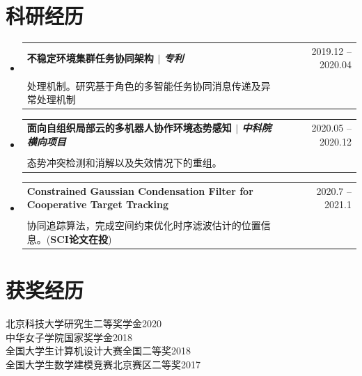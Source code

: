 \documentclass[a4paper,11pt]{ctexart}
\makeatletter
\newcommand{\CVItem}[1]{
	\item\small{
		{#1 \vspace{-2pt}}
	}
}
\newcommand{\CVSubheading}[4]{
	\vspace{-2pt}\item
	\begin{tabular*}{0.97\textwidth}[t]{l@{\extracolsep{\fill}}r}
		\textbf{#1} & #2 \\
		\small#3 & \small #4 \\
	\end{tabular*}\vspace{-7pt}
}
\newcommand{\CVSubHeadingListStart}{\begin{itemize}[leftmargin=0.5cm, label={}]}
\newcommand{\CVSubHeadingListEnd}{\end{itemize}}
\newcommand{\CVItemListStart}{\begin{itemize}}
\newcommand{\CVItemListEnd}{\end{itemize}\vspace{-5pt}}
\makeatother
\begin{document}
	\section{科研经历}
	\CVSubHeadingListStart
	\CVSubheading
	{不稳定环境集群任务协同架构 $|$ \emph{\small{专利}}}{2019.12 -- 2020.04}
	{\makecell[l]{\hspace{2em}构建基于角色的多智能体协同模型体系，建立多智能体间通用的分布式自适应的协同任务\\
		处理机制。研究基于角色的多智能任务协同消息传递及异常处理机制}}{}
	\CVSubheading
	{面向自组织局部云的多机器人协作环境态势感知 $|$ \emph{\small{中科院横向项目}}}{2020.05 -- 2020.12}
	{\makecell[l]{\hspace{2em}搭建面向云环境的多机器人自组织协同架构，研究云服务技术下的协同框架，支持协同\\
			态势冲突检测和消解以及失效情况下的重组。}}{}
	\CVSubheading
	{\small\textbf{Constrained Gaussian Condensation Filter for Cooperative Target Tracking} }{2020.7 -- 2021.1}
	{\makecell[l]{\hspace{2em}基于时空约束高斯聚合滤波的协同运动追踪，提出一种基于时空约束高斯聚合滤波的多目标\\
			协同追踪算法，完成空间约束优化时序滤波估计的位置信息。(\textbf{SCI论文在投})}}{}
	\CVSubHeadingListEnd
	
	

	
	\section{获奖经历}
	{北京科技大学研究生二等奖学金}\hfill{2020}\\
	{中华女子学院国家奖学金}\hfill{2018} \\
	{全国大学生计算机设计大赛全国二等奖}\hfill{2018} \\
	{全国大学生数学建模竞赛北京赛区二等奖}\hfill{2017}\\

	

	
\end{document}
